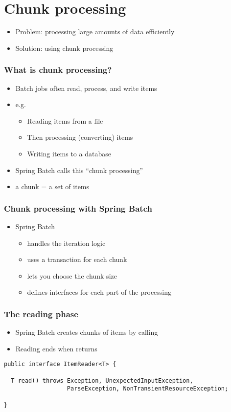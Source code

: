 \section{Chunk processing}

\begin{frame}
 \begin{itemize}
  \item Problem: processing large amounts of data efficiently
  \item Solution: using chunk processing
 \end{itemize}
\end{frame}

\begin{frame}
 \frametitle{What is chunk processing?}
 \begin{itemize}
  \item Batch jobs often read, process, and write items
  \item e.g.
  \begin{itemize}
    \item Reading items from a file
    \item Then processing (converting) items
    \item Writing items to a database  
  \end{itemize}
  \item Spring Batch calls this ``chunk processing''
  \item a chunk = a set of items
 \end{itemize}
\end{frame}


\begin{frame}
 \frametitle{Chunk processing with Spring Batch}
 \begin{itemize}
  \item Spring Batch
  \begin{itemize}
    \item handles the iteration logic
    \item uses a transaction for each chunk
    \item lets you choose the chunk size
    \item defines interfaces for each part of the processing
  \end{itemize}
 \end{itemize}
\end{frame}


\begin{frame}[fragile]
\frametitle{The reading phase}
\begin{itemize}
 \item Spring Batch creates chunks of items by calling 
 \item Reading ends when  returns 
\end{itemize}

\lstset{language=Java}
\begin{lstlisting}
public interface ItemReader<T> {

  T read() throws Exception, UnexpectedInputException, 
                  ParseException, NonTransientResourceException;

}
\end{lstlisting}
\end{frame}

